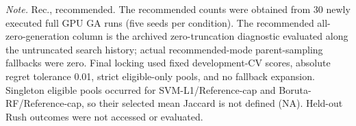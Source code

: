 \begin{table}[p]
\vspace{0.5em}
\parbox{0.98\linewidth}{\scriptsize\textit{Note.} Rec., recommended. The recommended counts were obtained from 30 newly executed full GPU GA runs (five seeds per condition). The recommended all-zero-generation column is the archived zero-truncation diagnostic evaluated along the untruncated search history; actual recommended-mode parent-sampling fallbacks were zero. Final locking used fixed development-CV scores, absolute regret tolerance 0.01, strict eligible-only pools, and no fallback expansion. Singleton eligible pools occurred for SVM-L1/Reference-cap and Boruta-RF/Reference-cap, so their selected mean Jaccard is not defined (NA). Held-out Rush outcomes were not accessed or evaluated.}
\end{table}
